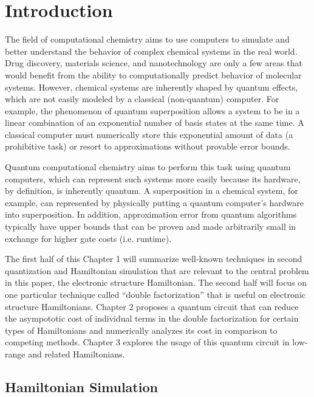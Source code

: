 

\chapter{Introduction}

The field of computational chemistry \cite{QCC} aims to use computers to simulate and better understand the behavior of complex chemical systems in the real world. Drug discovery, materials science, and nanotechnology are only a few areas that would benefit from the ability to computationally predict behavior of molecular systems. However, chemical systems are inherently shaped by quantum effects, which are not easily modeled by a classical (non-quantum) computer. For example, the phenomenon of quantum superposition allows a system to be in a linear combination of an exponential \cite{QCC} number of basis states at the same time. A classical computer must numerically store this exponential amount of data (a prohibitive task) or resort to approximations without provable error bounds.

Quantum computational chemistry aims to perform this task using quantum computers, which can represent such systems more easily because its hardware, by definition, is inherently quantum. A superposition in a chemical system, for example, can represented by physically putting a quantum computer's hardware into superposition. In addition, approximation error from quantum algorithms typically have upper bounds that can be proven and made arbitrarily small in exchange for higher gate costs (i.e. runtime).

The first half of this Chapter 1 will summarize well-known techniques in second quantization and Hamiltonian simulation that are relevant to the central problem in this paper, the electronic structure Hamiltonian. The second half will focus on one particular technique called ``double factorization'' that is useful on electronic structure Hamiltonians. Chapter 2 proposes a quantum circuit that can reduce the asympototic cost of individual terms in the double factorization for certain types of Hamiltonians and numerically analyzes its cost in comparison to competing methods. Chapter 3 explores the usage of this quantum circuit in low-range and related Hamiltonians.

\section{Hamiltonian Simulation}

